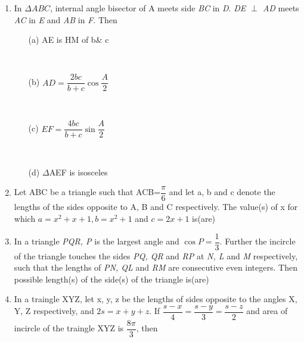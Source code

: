\documentclass[journal,12pt,twocolumn]{IEEEtran}
\begin{document}
\begin{enumerate}
\begin{itemize}
 \end{itemize}
 \item In $\Delta ABC$, internal angle bisector of \angle A meets side \textsl{BC} in \textsl{D}. \textsl{DE $\perp$ AD} meets \textsl{AC} in \textsl{E} and \textsl{AB} in \textsl{F}. Then
 \begin{itemize}
 \item[(a)] AE is HM of b\& c \item[~]\item[(b)] $AD=\dfrac{2bc}{b+c} \cos \dfrac{A}{2}$ \item[~]\item[(c)] $EF=\dfrac{4bc}{b+c} \sin \dfrac{A}{2}$  \item[~] \item[(d)] $\Delta$AEF is isosceles
 \end{itemize}
 \item Let ABC be a triangle such that \angle ACB=$\dfrac{\pi}{6}$ and let a, b and c denote the lengths of the sides opposite to A, B and C respectively. The value(s) of x for which $a=x^2+x+1, b=x^2+1$ and $c=2x+1$ is(are)
 \begin{itemize}
 \end{itemize}
 \item In a triangle \textsl{PQR, P} is the largest angle and $\cos P=\dfrac{1}{3}$. Further the incircle of the triangle touches the sides \textsl{PQ, QR} and \textsl{RP} at \textsl{N, L} and \textsl{M} respectively, such that the lengths of \textsl{PN, QL} and \textsl{RM} are consecutive even integers. Then possible length(s) of the side(s) of the triangle is(are)
 \begin{itemize}
 \end{itemize}
 \item In a traingle XYZ, let x, y, z be the lengths of sides opposite to the angles X, Y, Z respectively, and $2s=x+y+z$. If $\dfrac{s-x}{4}=\dfrac{s-y}{3}=\dfrac{s-z}{2}$ and area of incircle of the traingle XYZ is $\dfrac{8\pi}{3}$, then

\end{enumerate}
\end{document}
